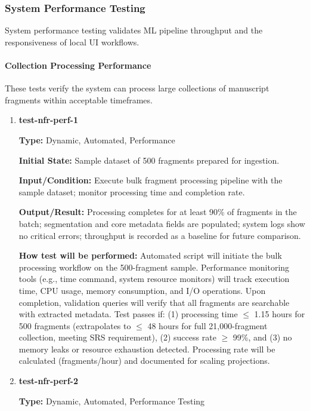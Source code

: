 \documentclass[12pt, titlepage]{article}
\begin{document}
\subsubsection{System Performance Testing}

System performance testing validates ML pipeline throughput and the responsiveness of local UI workflows.

\paragraph{Collection Processing Performance}

These tests verify the system can process large collections of manuscript fragments within acceptable timeframes.

\begin{enumerate}

\item \textbf{test-nfr-perf-1}

\textbf{Type:} Dynamic, Automated, Performance

\textbf{Initial State:} Sample dataset of 500 fragments prepared for ingestion.

\textbf{Input/Condition:} Execute bulk fragment processing pipeline with the sample dataset; monitor processing time and completion rate.

\textbf{Output/Result:} Processing completes for at least 90\% of fragments in the batch; segmentation and core metadata fields are populated; system logs show no critical errors; throughput is recorded as a baseline for future comparison.

\textbf{How test will be performed:} Automated script will initiate the bulk processing workflow on the 500-fragment sample. Performance monitoring tools (e.g., time command, system resource monitors) will track execution time, CPU usage, memory consumption, and I/O operations. Upon completion, validation queries will verify that all fragments are searchable with extracted metadata. Test passes if: (1) processing time $\leq$ 1.15 hours for 500 fragments (extrapolates to $\leq$ 48 hours for full 21,000-fragment collection, meeting SRS requirement), (2) success rate $\geq$ 99\%, and (3) no memory leaks or resource exhaustion detected. Processing rate will be calculated (fragments/hour) and documented for scaling projections.

\item \textbf{test-nfr-perf-2}

\textbf{Type:} Dynamic, Automated, Performance Testing


\end{enumerate}
\end{document}

